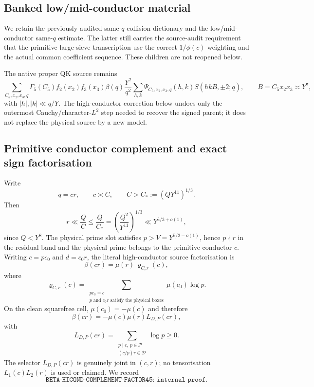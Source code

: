 \documentclass[11pt]{article}
\theoremstyle{definition}
\newcommand{\1}{\mathbf 1}
\begin{document}
\subsection{Banked low/mid-conductor material}

We retain the previously audited same-$q$ collision dictionary and the
low/mid-conductor same-$q$ estimate.  The latter still carries the source-audit
requirement that the primitive large-sieve transcription use the correct
$1/\phi(c)$ weighting and the actual common coefficient sequence.  These
children are not reopened below.

The native proper QK source remains
\[
 \sum_{C_5,x_2,x_3,q}
 \Gamma_5(C_5)f_2(x_2)f_3(x_3)\beta(q)\frac{Y^2}{q^2}
 \sum_{h,k}\Psi_{C_5,x_2,x_3,q}(h,k)
 S(hk\overline B,\pm2;q),
 \qquad
 B=C_5x_2x_3\asymp Y^7,
\]
with $|h|,|k|\ll q/Y$.  The high-conductor correction below undoes only the
outermost Cauchy/character-$L^2$ step needed to recover the signed parent; it
does not replace the physical source by a new model.

\subsection{Primitive conductor complement and exact sign factorisation}

Write
\[
   q=cr,
   \qquad
   c\asymp C,
   \qquad
   C>C_*:=(QY^{11})^{1/3}.
\]
Then
\[
   r\ll \frac QC
   \le \frac Q{C_*}
   =\left(\frac{Q^2}{Y^{11}}\right)^{1/3}
   \ll Y^{5/3+o(1)},
\]
since $Q<Y^8$.  The physical prime slot satisfies
$p>V=Y^{5/2-o(1)}$, hence $p\nmid r$ in the residual band and the physical
prime belongs to the primitive conductor $c$.  Writing $c=pc_0$ and
$d=c_0r$, the literal high-conductor source factorisation is
\begin{equation}
   \boxed{\beta(cr)=\mu(r)\,\varrho_{C,r}(c),}
   \label{eq:beta-complement}
\end{equation}
where
\[
 \varrho_{C,r}(c)
 =
 \sum_{\substack{pc_0=c\\
                  p\text{ and }c_0r\text{ satisfy the physical boxes}}}
   \mu(c_0)\log p.
\]
On the clean squarefree cell, $\mu(c_0)=-\mu(c)$ and therefore
\begin{equation}
  \boxed{
  \beta(cr)=-\mu(c)\mu(r)L_{D,P}(cr),
  }
  \label{eq:beta-clean}
\end{equation}
with
\[
 L_{D,P}(cr)
 =
 \sum_{\substack{p\mid c,\ p\in\mathcal P\\
                  (c/p)r\in\mathcal D}}
 \log p\ge0.
\]
The selector $L_{D,P}(cr)$ is genuinely joint in $(c,r)$; no tensorisation
$L_1(c)L_2(r)$ is used or claimed.  We record
\[
  \boxed{\texttt{BETA-HICOND-COMPLEMENT-FACTOR45: internal proof}.}
\]
\end{document}
